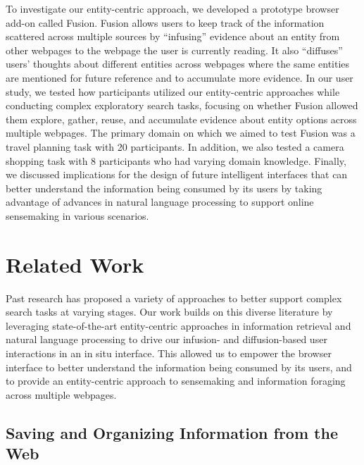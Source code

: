 To investigate our entity-centric approach, we developed a prototype browser add-on called Fusion. Fusion allows users to keep track of the information scattered across multiple sources by ``infusing'' evidence about an entity from other webpages to the webpage the user is currently reading. It also ``diffuses'' users' thoughts about different entities across webpages where the same entities are mentioned for future reference and to accumulate more evidence. In our user study, we tested how participants utilized our entity-centric approaches while conducting complex exploratory search tasks, focusing on whether Fusion allowed them explore, gather, reuse, and accumulate evidence about entity options across multiple webpages. The primary domain on which we aimed to test Fusion was a travel planning task with 20 participants. In addition, we also tested a camera shopping task with 8 participants who had varying domain knowledge.
Finally, we discussed implications for the design of future intelligent interfaces that can better understand the information being consumed by its users by taking advantage of advances in natural language processing to support online sensemaking in various scenarios.




\section{Related Work}

Past research has proposed a variety of approaches to better support complex search tasks at varying stages. Our work builds on this diverse literature by leveraging state-of-the-art entity-centric approaches in information retrieval and natural language processing to drive our infusion- and diffusion-based user interactions in an in situ interface. This allowed us to empower the browser interface to better understand the information being consumed by its users, and to provide an entity-centric approach to sensemaking and information foraging across multiple webpages.

\subsection{Saving and Organizing Information from the Web}

